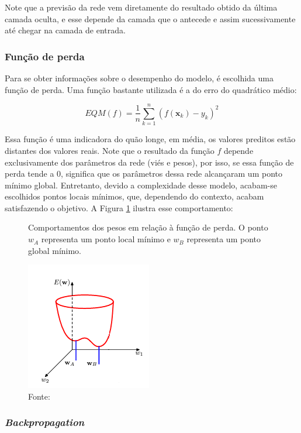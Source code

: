 Note que a previsão da rede vem diretamente do resultado obtido da última camada oculta, e esse depende da camada que o antecede e assim sucessivamente até chegar na camada de entrada.


\subsubsection{Função de perda}

Para se obter informações sobre o desempenho do modelo, é escolhida uma função de perda. Uma função bastante utilizada é a do erro do quadrático médio:

\[EQM(f) = \frac{1}{n} \sum_{k=1}^{n} (f(\textbf{x}_k) - y_k)^2\]

Essa função é uma indicadora do quão longe, em média, os valores preditos estão distantes dos valores reais. Note que o resultado da função $f$ depende exclusivamente dos parâmetros da rede (viés e pesos), por isso, se essa função de perda tende a 0, significa que  os parâmetros dessa rede alcançaram um ponto mínimo global. Entretanto, devido a complexidade desse modelo, acabam-se escolhidos pontos locais mínimos, que, dependendo do contexto, acabam satisfazendo o objetivo. A Figura \ref{fig:pesos_lossfunc} ilustra esse comportamento:

\begin{figure}[H]
    \centering
    \caption{Comportamentos dos pesos em relação à função de perda. O ponto $w_A$ representa um ponto local mínimo e $w_B$ representa um ponto global mínimo.}
    \includegraphics[scale=1]{imagens/pesos_loss_func.png}
    \caption*{Fonte: \cite{bishop2006pattern}}
    \label{fig:pesos_lossfunc}
    
\end{figure}

\subsubsection{\textit{Backpropagation}}

